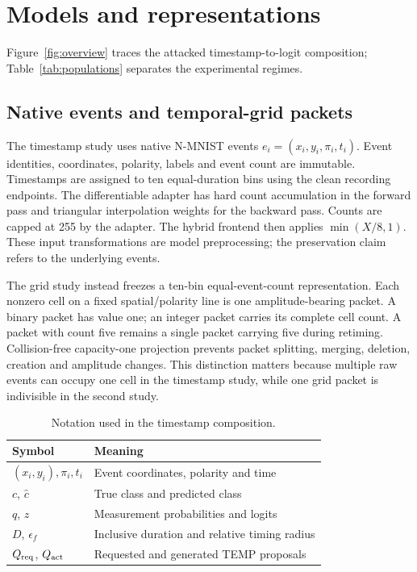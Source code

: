 \section{Models and representations}\label{sec:model}
Figure~\ref{fig:overview} traces the attacked timestamp-to-logit composition; Table~\ref{tab:populations} separates the experimental regimes.
\subsection{Native events and temporal-grid packets}
The timestamp study uses native N-MNIST events $e_i=(x_i,y_i,\pi_i,t_i)$. Event identities, coordinates, polarity, labels and event count are immutable. Timestamps are assigned to ten equal-duration bins using the clean recording endpoints. The differentiable adapter has hard count accumulation in the forward pass and triangular interpolation weights for the backward pass. Counts are capped at 255 by the adapter. The hybrid frontend then applies $\min(X/8,1)$. These input transformations are model preprocessing; the preservation claim refers to the underlying events.

The grid study instead freezes a ten-bin equal-event-count representation. Each nonzero cell on a fixed spatial/polarity line is one amplitude-bearing packet. A binary packet has value one; an integer packet carries its complete cell count. A packet with count five remains a single packet carrying five during retiming. Collision-free capacity-one projection prevents packet splitting, merging, deletion, creation and amplitude changes. This distinction matters because multiple raw events can occupy one cell in the timestamp study, while one grid packet is indivisible in the second study.


\begin{table}[t]\centering\small
\caption{Notation used in the timestamp composition.}\label{tab:notation}
\begin{tabularx}{\linewidth}{l L}\toprule
Symbol & Meaning\\\midrule
$(x_i,y_i),\pi_i,t_i$ & Event coordinates, polarity and time\\
$c$, $\widehat c$ & True class and predicted class\\
$q$, $z$ & Measurement probabilities and logits\\
$D$, $\epsilon_f$ & Inclusive duration and relative timing radius\\
$Q_{\rm req}$, $Q_{\rm act}$ & Requested and generated TEMP proposals\\\bottomrule
\end{tabularx}\end{table}

